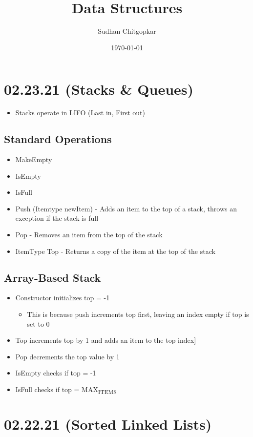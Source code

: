 \documentclass[11pt]{article}
\author{Sudhan Chitgopkar}
\date{\today}
\title{Data Structures}
\begin{document}
\maketitle
\section*{02.23.21 (Stacks \& Queues)}
\label{sec:org5ccb063}
\begin{itemize}
\item Stacks operate in LIFO (Last in, First out)
\end{itemize}
\subsection*{Standard Operations}
\label{sec:orgc3f33bc}
\begin{itemize}
\item MakeEmpty
\item IsEmpty
\item IsFull
\item Push (Itemtype newItem) - Adds an item to the top of a stack, throws an exception if the stack is full
\item Pop - Removes an item from the top of the stack
\item ItemType Top - Returns a copy of the item at the top of the stack
\end{itemize}
\subsection*{Array-Based Stack}
\label{sec:org8d11118}
\begin{itemize}
\item Constructor initializes top = -1
\begin{itemize}
\item This is because push increments top first, leaving an index empty if top is set to 0
\end{itemize}
\item Top increments top by 1 and adds an item to the top index]
\item Pop decrements the top value by 1
\item IsEmpty checks if top = -1
\item IsFull checks if top = MAX\textsubscript{ITEMS}
\end{itemize}
\section*{02.22.21 (Sorted Linked Lists)}
\label{sec:org5e2e50f}
\end{document}
